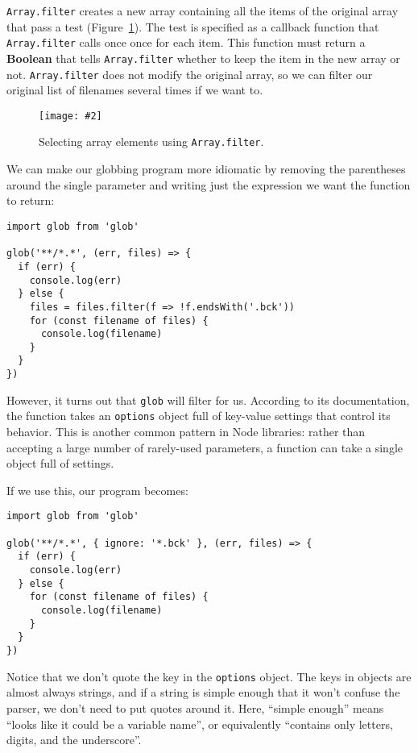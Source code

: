 \documentclass[krantzl]{krantz}
\newcommand{\figpdf}[4]{\begin{figure}%
\centering%
\texttt{[image: \#2]}%
\caption{#3}%
\label{#1}%
\end{figure}}
\newcommand{\figref}[1]{Figure~\ref{#1}}
\newcommand{\glossref}[1]{\textbf{#1}}
\begin{document}
\texttt{Array.filter} creates a new array
containing all the items of the original array that pass a test
(\figref{systems-programming-array-filter}).
The test is specified as a callback function
that \texttt{Array.filter} calls once once for each item.
This function must return a \glossref{Boolean}
that tells \texttt{Array.filter} whether to keep the item in the new array or not.
\texttt{Array.filter} does not modify the original array,
so we can filter our original list of filenames several times if we want to.

\figpdf{systems-programming-array-filter}{./systems-programming/array-filter.pdf}{Selecting array elements using \texttt{Array.filter}.}{0.6}


We can make our globbing program more idiomatic by
removing the parentheses around the single parameter
and writing just the expression we want the function to return:


\begin{lstlisting}[frame=tblr]
import glob from 'glob'

glob('**/*.*', (err, files) => {
  if (err) {
    console.log(err)
  } else {
    files = files.filter(f => !f.endsWith('.bck'))
    for (const filename of files) {
      console.log(filename)
    }
  }
})
\end{lstlisting}



However,
it turns out that \texttt{glob} will filter for us.
According to its documentation,
the function takes an \texttt{options} object full of key-value settings
that control its behavior.
This is another common pattern in Node libraries:
rather than accepting a large number of rarely-used parameters,
a function can take a single object full of settings.


If we use this,
our program becomes:


\begin{lstlisting}[frame=tblr]
import glob from 'glob'

glob('**/*.*', { ignore: '*.bck' }, (err, files) => {
  if (err) {
    console.log(err)
  } else {
    for (const filename of files) {
      console.log(filename)
    }
  }
})
\end{lstlisting}



\noindent Notice that we don’t quote the key in the \texttt{options} object.
The keys in objects are almost always strings,
and if a string is simple enough that it won’t confuse the parser,
we don’t need to put quotes around it.
Here,
“simple enough” means “looks like it could be a variable name”,
or equivalently “contains only letters, digits, and the underscore”.
\end{document}
